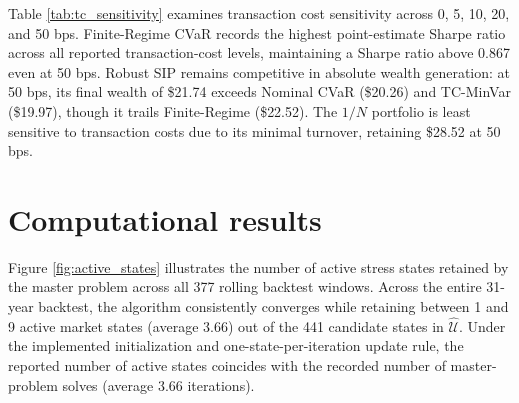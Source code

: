 \documentclass[smallextended]{svjour3}
\begin{document}
\begin{table}[htbp]
\centering
\caption{Transaction cost sensitivity: out-of-sample performance under alternative cost levels}
\label{tab:tc_sensitivity}
\end{table}

Table \ref{tab:tc_sensitivity} examines transaction cost sensitivity across 0, 5, 10, 20, and 50 bps. Finite-Regime CVaR records the highest point-estimate Sharpe ratio across all reported transaction-cost levels, maintaining a Sharpe ratio above 0.867 even at 50 bps. Robust SIP remains competitive in absolute wealth generation: at 50 bps, its final wealth of \$21.74 exceeds Nominal CVaR (\$20.26) and TC-MinVar (\$19.97), though it trails Finite-Regime (\$22.52). The $1/N$ portfolio is least sensitive to transaction costs due to its minimal turnover, retaining \$28.52 at 50 bps.

\section{Computational results}
Figure \ref{fig:active_states} illustrates the number of active stress states retained by the master problem across all 377 rolling backtest windows. Across the entire 31-year backtest, the algorithm consistently converges while retaining between 1 and 9 active market states (average 3.66) out of the 441 candidate states in $\widehat{\mathcal{U}}$. Under the implemented initialization and one-state-per-iteration update rule, the reported number of active states coincides with the recorded number of master-problem solves (average 3.66 iterations).
\end{document}
